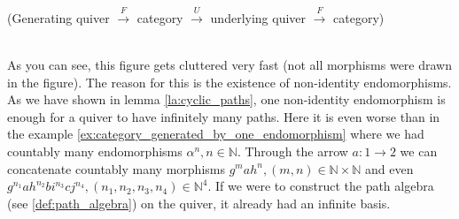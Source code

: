 \begin{example}{(Generating quiver $\xrightarrow{F}$ category $\xrightarrow{U}$ underlying quiver $\xrightarrow{F}$ category)}
\begin{enumerate}
\begin{minipage}{.37\textwidth}
\end{minipage}
%
\begin{minipage}{.08\textwidth}
\phantom{}
\end{minipage}\\

As you can see, this figure gets cluttered very fast (not all morphisms were drawn in the figure). The reason for this is the existence of non-identity endomorphisms.
As we have shown in lemma \ref{la:cyclic_paths}, one non-identity endomorphism is enough for a quiver to have infinitely many paths.
Here it is even worse than in the example \ref{ex:category_generated_by_one_endomorphism} where we had countably many endomorphisms
$\alpha^{n}, n \in \mathbb{N}$. Through the arrow $a : 1 \rightarrow 2$ we can concatenate countably many morphisms
$g^{m}ah^{n}, (m,n) \in \mathbb{N}\times\mathbb{N}$ and even $g^{n_{1}}ah^{n_{2}}bi^{n_{3}}cj^{n_{4}}, (n_{1}, n_{2}, n_{3}, n_{4}) \in \mathbb{N}^{4}$.
If we were to construct the path algebra (see \ref{def:path_algebra}) on the quiver, it already had an infinite basis.
\end{enumerate}
\end{example}

